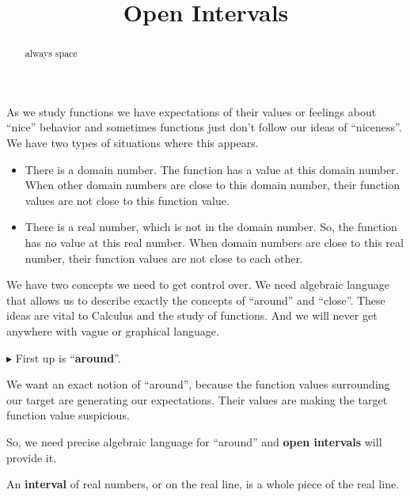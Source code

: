 \documentclass{ximera}
\title{Open Intervals}
\begin{document}
\begin{abstract}
always space
\end{abstract}
\maketitle




As we study functions we have expectations of their values or feelings about ``nice'' behavior and sometimes functions just don't follow our ideas of ``niceness''.  We have two types of situations where this appears.

\begin{itemize}
\item There is a domain number. The function has a value at this domain number. When other domain numbers are close to this domain number, their function values are not close to this function value.
\item There is a real number, which is not in the domain number. So, the function has no value at this real number. When  domain numbers are close to this real number, their function values are not close to each other.
\end{itemize}


We have two concepts we need to get control over. We need algebraic language that allows us to describe exactly the concepts of ``around'' and ``close''.  These ideas are vital to Calculus and the study of functions.  And we will never get anywhere with vague or graphical language.


\textbf{\textcolor{red!90!darkgray}{$\blacktriangleright$}} First up is ``\textbf{\textcolor{purple!85!blue}{around}}''.



We want an exact notion of ``around'', because the function values surrounding our target are generating our expectations.  Their values are making the target function value suspicious.

So, we need precise algebraic language for ``around'' and \textbf{open intervals} will provide it.















An \textbf{interval} of real numbers, or on the real line, is a whole piece of the real line.
\end{document}
